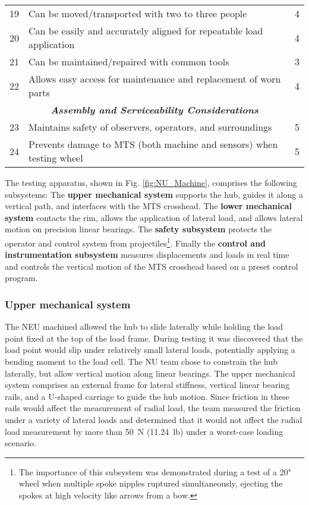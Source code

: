 \documentclass[\rootdir/thesis.tex]{subfiles}
\begin{document}
\begin{table}
\begin{tabularx}{\linewidth}{r|Xc}
\hline
19& Can be moved/transported with two to three people& 4\\
20& Can be easily and accurately aligned for repeatable load application& 4\\
21& Can be maintained/repaired with common tools& 3\\
22& Allows easy access for maintenance and replacement of worn parts& 4\\
\hline
\multicolumn{3}{c}{\emph{\textbf{Assembly and Serviceability Considerations}}}\\
\hline
23& Maintains safety of observers, operators, and surroundings& 5\\
24& Prevents damage to MTS (both machine and sensors) when testing wheel& 5\\
\hline
\end{tabularx}
\end{table}

The testing apparatus, shown in Fig. \ref{fig:NU_Machine}, comprises the following subsystems: The \textbf{upper mechanical system} supports the hub, guides it along a vertical path, and interfaces with the MTS crosshead. The \textbf{lower mechanical system} contacts the rim, allows the application of lateral load, and allows lateral motion on precision linear bearings. The \textbf{safety subsystem} protects the operator and control system from projectiles\footnote{The importance of this subsystem was demonstrated during a test of a 20" wheel when multiple spoke nipples ruptured simultaneously, ejecting the spokes at high velocity like arrows from a bow.}. Finally the \textbf{control and instrumentation subsystem} measures displacements and loads in real time and controls the vertical motion of the MTS crosshead based on a preset control program.

\subsubsection*{Upper mechanical system}
The NEU machined allowed the hub to slide laterally while holding the load point fixed at the top of the load frame. During testing it was discovered that the load point would slip under relatively small lateral loads, potentially applying a bending moment to the load cell. The NU team chose to constrain the hub laterally, but allow vertical motion along linear bearings. The upper mechanical system comprises an external frame for lateral stiffness, vertical linear bearing rails, and a U-shaped carriage to guide the hub motion. Since friction in these rails would affect the measurement of radial load, the team measured the friction under a variety of lateral loads and determined that it would not affect the radial load measurement by more than \SI{50}{\newton} (\SI{11.24}{lb}) under a worst-case loading scenario.
\end{document}
